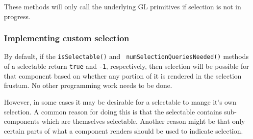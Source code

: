\documentclass{article}
\begin{document}
These methods will only call the underlying GL primitives if selection
is not in progress.

\subsubsection{Implementing custom selection}
\label{managingOwnSelectionSec}

By default, if the {\tt isSelectable()} and {\tt
numSelectionQueriesNeeded()} methods of a selectable return {\tt true}
and {\tt -1}, respectively, then selection will be possible for that
component based on whether any portion of it is rendered in the
selection frustum. No other programming work needs to be done.

However, in some cases it may be desirable for a selectable to mange
it's own selection. A common reason for doing this is that the
selectable contains sub-components which are themselves
selectable. Another reason might be that only certain parts of what a
component renders should be used to indicate selection.
\end{document}
